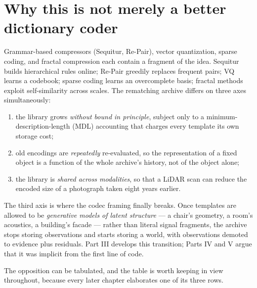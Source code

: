 \documentclass[11pt,oneside]{book}
\theoremstyle{remark}
\begin{document}
\section{Why this is not merely a better dictionary coder}

Grammar-based compressors (Sequitur, Re-Pair), vector quantization,
sparse coding, and fractal compression each contain a fragment of the
idea. Sequitur builds hierarchical rules online; Re-Pair greedily
replaces frequent pairs; VQ learns a codebook; sparse coding learns an
overcomplete basis; fractal methods exploit self-similarity across
scales. The rematching archive differs on three axes simultaneously:

\begin{enumerate}[leftmargin=2em]
\item the library grows \emph{without bound in principle}, subject only
to a minimum-description-length (MDL) accounting that charges every
template its own storage cost;
\item old encodings are \emph{repeatedly} re-evaluated, so the
representation of a fixed object is a function of the whole archive's
history, not of the object alone;
\item the library is \emph{shared across modalities}, so that a LiDAR
scan can reduce the encoded size of a photograph taken eight years
earlier.
\end{enumerate}

The third axis is where the codec framing finally breaks. Once templates
are allowed to be \emph{generative models of latent structure} --- a
chair's geometry, a room's acoustics, a building's facade --- rather than
literal signal fragments, the archive stops storing observations and
starts storing a world, with observations demoted to evidence plus
residuals. Part III develops this transition; Parts IV and V argue that
it was implicit from the first line of code.

The opposition can be tabulated, and the table is worth keeping in view
throughout, because every later chapter elaborates one of its three
rows.
\end{document}
